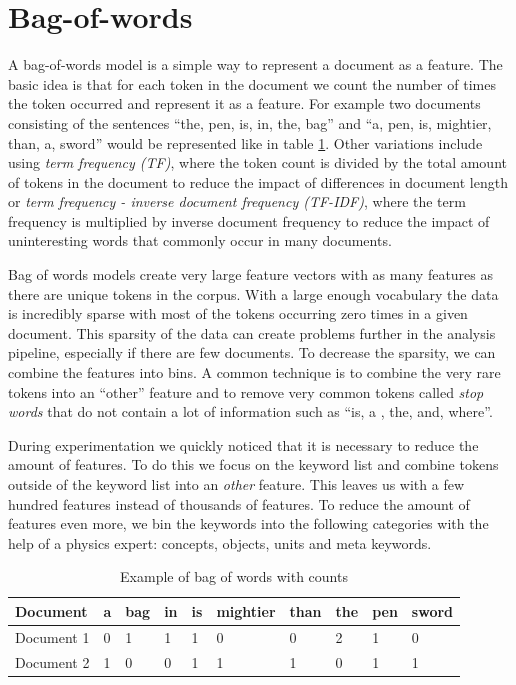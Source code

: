\documentclass[utf8,english]{gradu3}
\begin{document}

\section{Bag-of-words}
A bag-of-words model is a simple way to represent a document as a feature. The basic idea is that for each token in the document we count the number of times the token occurred and represent it as a feature. For example two documents consisting of the sentences \enquote{the, pen, is, in, the, bag} and \enquote{a, pen, is, mightier, than, a, sword} would be represented like in table \ref{table:counts}. Other variations include using \emph{term frequency (TF)}, where the token count is divided by the total amount of tokens in the document to reduce the impact of differences in document length or \emph{term frequency - inverse document frequency (TF-IDF)}, where the term frequency is multiplied by inverse document frequency to reduce the impact of uninteresting words that commonly occur in many documents. 

Bag of words models create very large feature vectors with as many features as there are unique tokens in the corpus. With a large enough vocabulary the data is incredibly sparse with most of the tokens occurring zero times in a given document. This sparsity of the data can create problems further in the analysis pipeline, especially if there are few documents. To decrease the sparsity, we can combine the features into bins. A common technique is to combine the very rare tokens into an \enquote{other} feature and to remove very common tokens called \emph{stop words} that do not contain a lot of information such as \enquote{is, a , the, and, where}.

During experimentation we quickly noticed that it is necessary to reduce the amount of features. To do this we focus on the keyword list and combine tokens outside of the keyword list into an \emph{other} feature. This leaves us with a few hundred features instead of thousands of features. To reduce the amount of features even more, we bin the keywords into the following categories with the help of a physics expert: concepts, objects, units and meta keywords.

\begin{table}[]
  \begin{tabular}{ | l | l | l | l | l | l | l | l | l | l |}
    \hline
    \textbf{Document} & \textbf{a} & \textbf{bag} & \textbf{in} & \textbf{is} & \textbf{mightier} & \textbf{than} & \textbf{the} & \textbf{pen} & \textbf{sword}\\ \hline
    Document 1 & 0 & 1 & 1 & 1 & 0 & 0 & 2 & 1 & 0\\ \hline
    Document 2 & 1 & 0 & 0 & 1 & 1 & 1 & 0 & 1 & 1\\
    \hline
  \end{tabular}
  \caption{Example of bag of words with counts}
  \label{table:counts}
\end{table}
\end{document}
